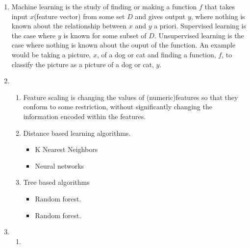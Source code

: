 \begin{enumerate}
  \item Machine learning is the study of finding or making a function $f$ that takes input $x$(feature vector) from some set $D$ and gives output $y$, where nothing is known about the relationship between $x$ and $y$ a priori.
        Supervised learning is the case where $y$ is known for some subset of $D$.
        Unsupervised learning is the case where nothing is known about the ouput of the function.
        An example would be taking a picture, $x$, of a dog or cat and finding a function, $f$, to classify the picture as a picture of a dog or cat, $y$.
  \item
      \begin{enumerate}
        \item Feature scaling is changing the values of (numeric)features so that they conform to some restriction, without significantly changing the information encoded within the features.
        \item Distance based learning algorithms.
          \begin{itemize}
            \item K Nearest Neighbors
            \item Neural networks
          \end{itemize}
        \item Tree based algorithms
          \begin{itemize}
            \item Random forest.
            \item Random forest.
          \end{itemize}
      \end{enumerate}
    \item
      \begin{enumerate}
        \item
          \begin{minipage}[t]{0.9\textwidth}
            \centering
\end{minipage}
\end{enumerate}
\end{enumerate}
